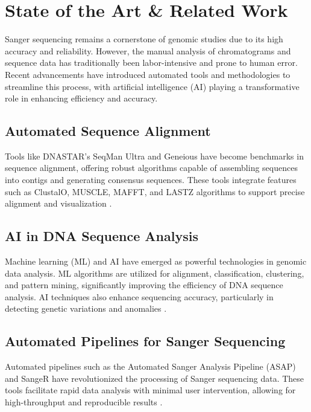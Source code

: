 
%

\chapter{State of the Art \& Related Work}
\label{cha:users_manual}

\glsresetall

Sanger sequencing remains a cornerstone of genomic studies due to its high accuracy and reliability. However, the manual analysis of chromatograms and sequence data has traditionally been labor-intensive and prone to human error. Recent advancements have introduced automated tools and methodologies to streamline this process, with artificial intelligence (AI) playing a transformative role in enhancing efficiency and accuracy.

\section{Automated Sequence Alignment}
Tools like DNASTAR's SeqMan Ultra and Geneious have become benchmarks in sequence alignment, offering robust algorithms capable of assembling sequences into contigs and generating consensus sequences. These tools integrate features such as ClustalO, MUSCLE, MAFFT, and LASTZ algorithms to support precise alignment and visualization \cite{dnastar,geneious}.

\section{AI in DNA Sequence Analysis}
Machine learning (ML) and AI have emerged as powerful technologies in genomic data analysis. ML algorithms are utilized for alignment, classification, clustering, and pattern mining, significantly improving the efficiency of DNA sequence analysis. AI techniques also enhance sequencing accuracy, particularly in detecting genetic variations and anomalies \cite{frontiers,pmc_ml}.

\section{Automated Pipelines for Sanger Sequencing}
Automated pipelines such as the Automated Sanger Analysis Pipeline (ASAP) and SangeR have revolutionized the processing of Sanger sequencing data. These tools facilitate rapid data analysis with minimal user intervention, allowing for high-throughput and reproducible results \cite{pmc_asap,bioinformaticsadvances}.

